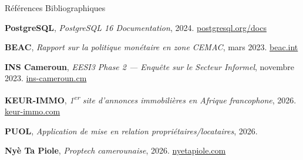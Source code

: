 \begin{frame}[allowframebreaks]{Références Bibliographiques}
\begin{enumerate}[label={[\arabic*]}, leftmargin=0.8cm, itemsep=2pt]
    \item \textbf{PostgreSQL}, \textit{PostgreSQL 16 Documentation}, 2024. \url{postgresql.org/docs}
    \item \textbf{BEAC}, \textit{Rapport sur la politique monétaire en zone CEMAC}, mars 2023. \url{beac.int}
    \item \textbf{INS Cameroun}, \textit{EESI3 Phase 2 — Enquête sur le Secteur Informel}, novembre 2023. \url{ins-cameroun.cm}
    \item \textbf{KEUR-IMMO}, \textit{1\textsuperscript{er} site d'annonces immobilières en Afrique francophone}, 2026. \url{keur-immo.com}
    \item \textbf{PUOL}, \textit{Application de mise en relation propriétaires/locataires}, 2026.
    \item \textbf{Nyè Ta Piole}, \textit{Proptech camerounaise}, 2026. \url{nyetapiole.com}
  \end{enumerate}
\end{frame}